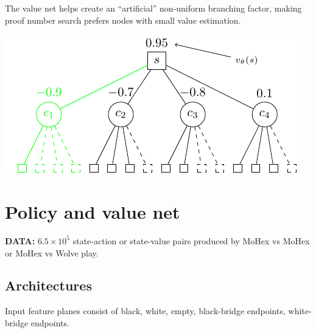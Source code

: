 \documentclass[a0,portrait]{a0poster}
\begin{document}
\begin{multicols}{3}
The value net helps create an ``artificial'' non-uniform branching factor, making proof number search prefers nodes with small value estimation. 
\begin{center}\vspace{1cm}
\includegraphics[width=0.7\linewidth]{andor_why_prefer_small_value_net_estimation.pdf}
\end{center}%

\section*{Policy and value net}
\textbf{DATA:} $6.5\times 10^5$ state-action or state-value pairs produced by MoHex vs MoHex or MoHex vs Wolve play. 

\subsection*{Architectures}
Input feature planes consist of black, white, empty, black-bridge endpoints, white-bridge endpoints.


\end{multicols}
\end{document}
